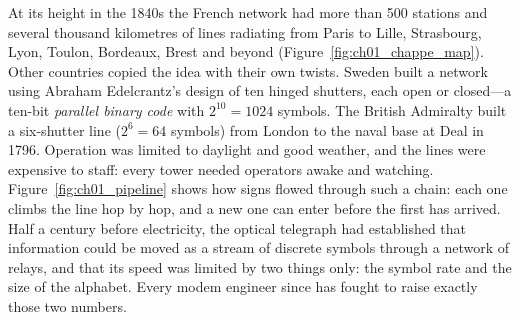At its height in the 1840s the French network had more than 500 stations and several thousand
kilometres of lines radiating from Paris to Lille, Strasbourg, Lyon, Toulon, Bordeaux, Brest and
beyond (Figure~\ref{fig:ch01_chappe_map}). Other countries copied the idea with their own twists. Sweden built a network using Abraham
Edelcrantz's design of ten hinged shutters, each open or closed---a ten-bit \emph{parallel binary
code} with $2^{10}=1024$ symbols. The British Admiralty built a six-shutter line ($2^6=64$ symbols)
from London to the naval base at Deal in 1796. Operation was limited to daylight and good weather,
and the lines were expensive to staff: every tower needed operators awake and watching.
Figure~\ref{fig:ch01_pipeline} shows how signs flowed through such a chain: each one climbs the
line hop by hop, and a new one can enter before the first has arrived. Half a century before
electricity, the optical telegraph had established that information could be moved as a stream of
discrete symbols through a network of relays, and that its speed was limited by two things only:
the symbol rate and the size of the alphabet. Every modem engineer since has fought to raise
exactly those two numbers.

